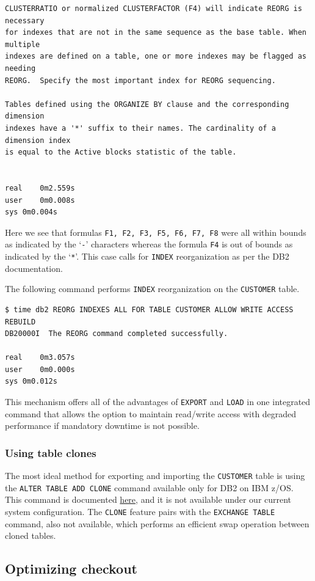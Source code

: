 \documentclass[letterpaper]{article}%
\begin{document}
\begin{Verbatim}[frame=single]
CLUSTERRATIO or normalized CLUSTERFACTOR (F4) will indicate REORG is necessary
for indexes that are not in the same sequence as the base table. When multiple
indexes are defined on a table, one or more indexes may be flagged as needing
REORG.  Specify the most important index for REORG sequencing.

Tables defined using the ORGANIZE BY clause and the corresponding dimension
indexes have a '*' suffix to their names. The cardinality of a dimension index
is equal to the Active blocks statistic of the table.


real    0m2.559s
user    0m0.008s
sys 0m0.004s
\end{Verbatim}

Here we see that formulas \texttt{F1, F2, F3, F5, F6, F7, F8} were all within
bounds as indicated by the `\texttt{-}' characters whereas the formula
\texttt{F4} is out of bounds as indicated by the `\texttt{*}'. This case calls
for \texttt{INDEX} reorganization as per the DB2 documentation.

The following command performs \texttt{INDEX} reorganization on the
\texttt{CUSTOMER} table.
\begin{Verbatim}[frame=single]
$ time db2 REORG INDEXES ALL FOR TABLE CUSTOMER ALLOW WRITE ACCESS REBUILD
DB20000I  The REORG command completed successfully.

real    0m3.057s
user    0m0.000s
sys 0m0.012s
\end{Verbatim}

This mechanism offers all of the advantages of \texttt{EXPORT} and
\texttt{LOAD} in one integrated command that allows the option to maintain
read/write access with degraded performance if mandatory downtime is not
possible.

\subsubsection{Using table clones}

The most ideal method for exporting and importing the \texttt{CUSTOMER} table is
using the \texttt{ALTER TABLE ADD CLONE} command available only for DB2 on IBM
z/OS. This command is documented \href{%
  http://publib.boulder.ibm.com/infocenter/dzichelp/v2r2/index.jsp?topic=%
  m.db2z10.doc.admin%
}{here}, and it is not available under our current system configuration. The
\texttt{CLONE} feature pairs with the \texttt{EXCHANGE TABLE} command, also not
available, which performs an efficient swap operation between cloned tables.

\subsection{Optimizing checkout}
\end{document}
